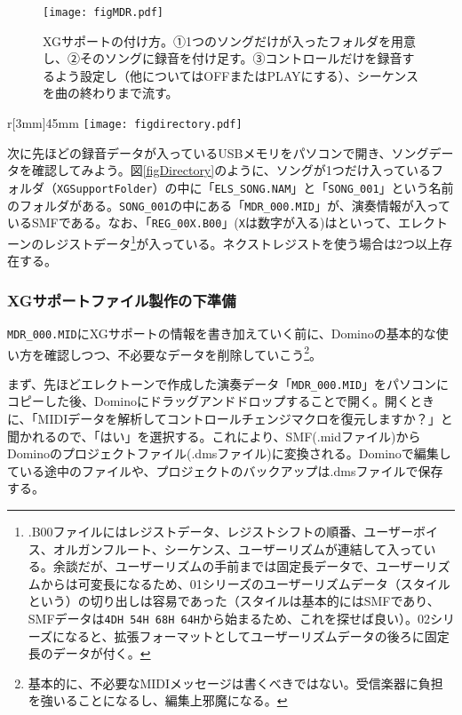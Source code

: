 \documentclass[uplatex, 10pt, dvipdfmx]{jsarticle}
\numberwithin{equation}{section}
\newcommand{\emphj}[1]{\textbf{\textrm{\textgt{{#1}}}}}
\begin{document}
\begin{figure}[h]
  \centering
  \texttt{[image: figMDR.pdf]}
  \caption{XGサポートの付け方。①1つのソングだけが入ったフォルダを用意し、②そのソングに録音を付け足す。③コントロールだけを録音するよう設定し（他についてはOFFまたはPLAYにする）、シーケンスを曲の終わりまで流す。}
  \label{figMDRrec}
\end{figure}

\newpage

\begin{wrapfigure}[8]{r}[3mm]{45mm}
  \centering
  \texttt{[image: figdirectory.pdf]}
  \caption{ソング内の構造。}
  \label{figDirectory}
\end{wrapfigure}

次に先ほどの録音データが入っているUSBメモリをパソコンで開き、ソングデータを確認してみよう。図\ref{figDirectory}のように、ソングが1つだけ入っているフォルダ（\texttt{XGSupportFolder}）の中に「\texttt{ELS_SONG.NAM}」と「\texttt{SONG_001}」という名前のフォルダがある。\texttt{SONG_001}の中にある「\texttt{MDR_000.MID}」が、演奏情報が入っているSMFである。なお、「\texttt{REG_00X.B00}」(\texttt{X}は数字が入る)は\emphj{バルクファイル}といって、エレクトーンのレジストデータ\footnote{.B00ファイルにはレジストデータ、レジストシフトの順番、ユーザーボイス、オルガンフルート、シーケンス、ユーザーリズムが連結して入っている\cite{B00}。余談だが、ユーザーリズムの手前までは固定長データで、ユーザーリズムからは可変長になるため、01シリーズのユーザーリズムデータ（スタイルという）の切り出しは容易であった（スタイルは基本的にはSMFであり、SMFデータは\texttt{4DH 54H 68H 64H}から始まるため、これを探せば良い）。02シリーズになると、拡張フォーマットとしてユーザーリズムデータの後ろに固定長のデータが付く。}が入っている。ネクストレジストを使う場合は2つ以上存在する。

\subsubsection{XGサポートファイル製作の下準備}
\texttt{MDR_000.MID}にXGサポートの情報を書き加えていく前に、Dominoの基本的な使い方を確認しつつ、不必要なデータを削除していこう\footnote{基本的に、不必要なMIDIメッセージは書くべきではない。受信楽器に負担を強いることになるし、編集上邪魔になる。}。

まず、先ほどエレクトーンで作成した演奏データ「\texttt{MDR_000.MID}」をパソコンにコピーした後、Dominoにドラッグアンドドロップすることで開く。開くときに、「MIDIデータを解析してコントロールチェンジマクロを復元しますか？」と聞かれるので、「はい」を選択する。これにより、SMF(.midファイル)からDominoのプロジェクトファイル(.dmsファイル)に変換される。Dominoで編集している途中のファイルや、プロジェクトのバックアップは.dmsファイルで保存する。
\end{document}

